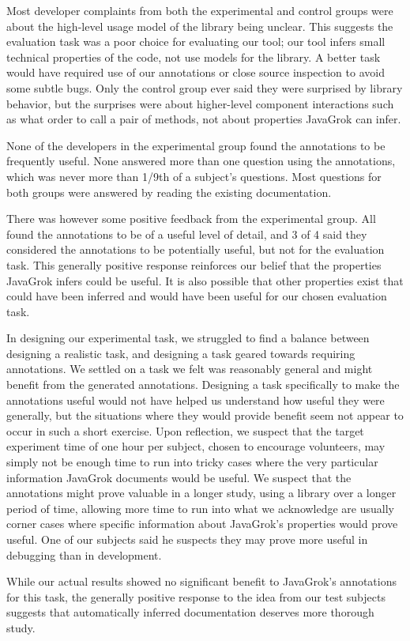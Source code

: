 Most developer complaints from both the experimental and control groups were
about the high-level usage model of the library being unclear.  This suggests
the evaluation task was
a poor choice for evaluating our tool; our tool infers small technical
properties of the code, not use models for the library.  A better task would
have required use of our annotations or close source inspection to avoid some
subtle bugs.  Only the control group ever said they were surprised by library
behavior, but the surprises were about higher-level component interactions such
as what order to call a pair of methods, not about properties JavaGrok can
infer.

None of the developers in the experimental group found the annotations to be
frequently useful.  None answered more than one question using the
annotations, which was never more than 1/9th of a subject's questions.  Most
questions for both groups were answered by reading the existing documentation.

There was however some positive feedback from the experimental group.  All
found the annotations to be of a useful level of detail, and 3 of 4 said they
considered the annotations
to be potentially useful, but not for the evaluation task.  This generally
positive response reinforces our belief that the properties
JavaGrok infers could be useful.  It is also possible that other properties
exist that could have been inferred and would have been useful for our chosen
evaluation task.

In designing
our experimental task, we struggled to find a balance between designing a
realistic task, and designing a task geared towards requiring annotations.  We
settled on a task we felt was reasonably general and might benefit from the
generated annotations.  Designing a task specifically to make the annotations useful would
not have helped us understand how useful they were generally, but the situations
where they would provide benefit seem not appear to occur in such a short exercise.
Upon reflection, we suspect that the target experiment time of one hour per
subject, chosen to encourage volunteers, may simply not be enough time to run
into tricky cases where the very particular information JavaGrok documents would
be useful.  We suspect that the annotations might prove valuable in a longer
study, using a library over a longer period of time, allowing more time to run
into what we acknowledge are usually corner cases where specific information
about JavaGrok's properties would prove useful.  One of our subjects said he
suspects they may prove more useful in debugging than in development.

While our actual results showed no significant benefit to JavaGrok's annotations
for this task, the generally positive response to the idea from our test
subjects suggests that automatically inferred documentation deserves more
thorough study.


